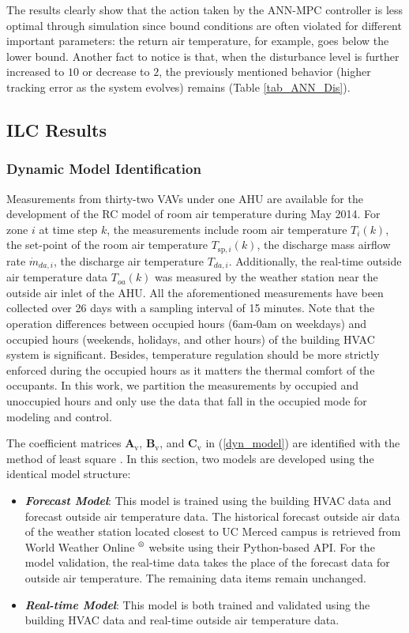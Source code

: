 \documentclass[conference]{IEEEtran}
\begin{document}
The results clearly show that the action taken by the ANN-MPC controller is less optimal through simulation since bound conditions are often violated for different important parameters: the return air temperature, for example, goes below the lower bound. Another fact to notice is that, when the disturbance level is further increased to $10$ or decrease to $2$, the previously mentioned behavior (higher tracking error as the system evolves) remains (Table \ref{tab_ANN_Dis}).

\subsection{ILC Results}
\subsubsection{Dynamic Model Identification}
Measurements from thirty-two VAVs under one AHU are available for the development of the RC model of room air temperature during May 2014. For zone $i$ at time step $k$, the measurements include room air temperature $T_{i}(k)$, the set-point of the room air temperature $T_{\text{sp},i}(k)$, the discharge mass airflow rate $\dot{m}_{da,i}$, the discharge air temperature $T_{da,i}$. Additionally, the real-time outside air temperature data $T_{oa}(k)$ was measured by the weather station near the outside air inlet of the AHU. All the aforementioned measurements have been collected over 26 days with a sampling interval of 15 minutes. Note that the operation differences between occupied hours (6am-0am on weekdays) and occupied hours (weekends, holidays, and other hours) of the building HVAC system is significant. Besides, temperature regulation should be more strictly enforced during the occupied hours as it matters the thermal comfort of the occupants. In this work, we partition the measurements by occupied and unoccupied hours and only use the data that fall in the occupied mode for modeling and control.

The coefficient matrices $\mathbf{A}_{\textrm{v}}$, $\mathbf{B}_{\textrm{v}}$, and $\mathbf{C}_{\textrm{v}}$ in (\ref{dyn_model}) are identified with the method of least square \cite{WuSun12}. In this section, two models are developed using the identical model structure:
\begin{itemize}
\item \textbf{\textit{Forecast Model}}: This model is trained using the building HVAC data and forecast outside air temperature data. The historical forecast outside air data of the weather station located closest to UC Merced campus is retrieved from World Weather Online $\textsuperscript{\textregistered}$ \cite{wwo2022api} website using their Python-based API. For the model validation, the real-time data takes the place of the forecast data for outside air temperature. The remaining data items remain unchanged.
\item \textbf{\textit{Real-time Model}}: This model is both trained and validated using the building HVAC data and real-time outside air temperature data.
\end{itemize}
\end{document}
